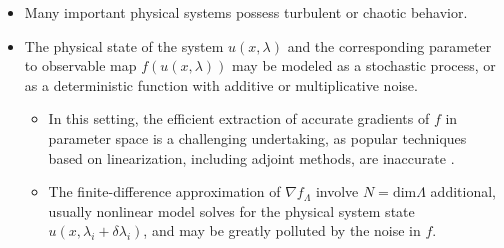 \documentclass[11pt]{beamer}
\begin{document}
\begin{frame}

\begin{itemize}

\item Many important physical systems possess turbulent or chaotic behavior.  

\item The physical state of the system $u(x,\lambda)$ and the corresponding parameter
to observable map $f(u(x,\lambda))$ may be modeled as a stochastic process, or as a deterministic function with additive or multiplicative noise.  

\begin{itemize}


\item In this setting, the efficient extraction of accurate gradients of $f$ in parameter space is a challenging undertaking, as popular techniques based on
linearization, including adjoint methods, are inaccurate \footnotemark[1] \footnotemark[2].  

\item The finite-difference approximation of $\nabla f_\Lambda$ 
involve $N=\text{dim}\Lambda$ 
additional, usually nonlinear model solves for the physical system state $u(x,\lambda_i + \delta \lambda_i)$, and may be greatly polluted by the noise in $f$.

\end{itemize}


\end{itemize}


\end{frame}
\end{document}
